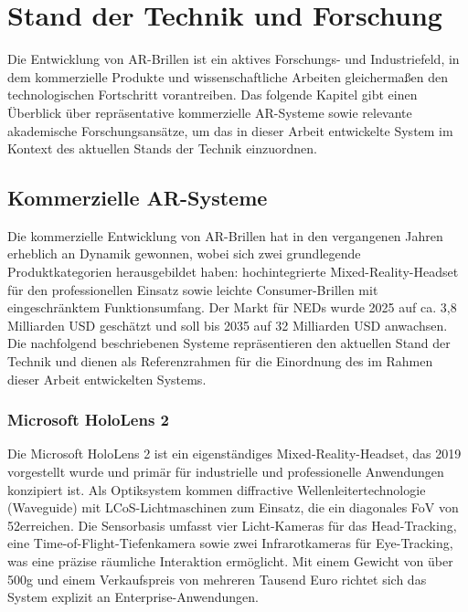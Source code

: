 

\chapter{Stand der Technik und Forschung}
\label{chap:StandTechnikUForschung}
Die Entwicklung von \ac{AR}-Brillen ist ein aktives Forschungs- und Industriefeld, in dem kommerzielle Produkte und wissenschaftliche Arbeiten gleichermaßen den technologischen Fortschritt vorantreiben. Das folgende Kapitel gibt einen Überblick über repräsentative kommerzielle \ac{AR}-Systeme sowie relevante akademische Forschungsansätze, um das in dieser Arbeit entwickelte System im Kontext des aktuellen Stands der Technik einzuordnen.

\section{Kommerzielle AR-Systeme}
\label{sec:KommerzielleSysteme}
Die kommerzielle Entwicklung von \ac{AR}-Brillen hat in den vergangenen Jahren erheblich an Dynamik gewonnen, wobei sich zwei grundlegende Produktkategorien herausgebildet haben: hochintegrierte Mixed-Reality-Headset für den professionellen Einsatz sowie leichte Consumer-Brillen mit eingeschränktem Funktionsumfang. Der Markt für \ac{NED}s wurde 2025 auf ca. 3,8 Milliarden USD geschätzt und soll bis 2035 auf 32 Milliarden USD anwachsen. Die nachfolgend beschriebenen Systeme repräsentieren den aktuellen Stand der Technik und dienen als Referenzrahmen für die Einordnung des im Rahmen dieser Arbeit entwickelten Systems.\autocite[vgl. ]{EyeDisplayMarket}

\subsection{Microsoft HoloLens 2}
\label{subsec:HoloLens}
Die Microsoft HoloLens 2 ist ein eigenständiges Mixed-Reality-Headset, das 2019 vorgestellt wurde und primär für industrielle und professionelle Anwendungen konzipiert ist. Als Optiksystem kommen diffractive Wellenleitertechnologie (Waveguide) mit \ac{LCoS}-Lichtmaschinen zum Einsatz, die ein diagonales \ac{FoV} von 52\textdegree erreichen. 
\newpage
Die Sensorbasis umfasst vier Licht-Kameras für das Head-Tracking, eine Time-of-Flight-Tiefenkamera sowie zwei Infrarotkameras für Eye-Tracking, was eine präzise räumliche Interaktion ermöglicht. Mit einem Gewicht von über 500g und einem Verkaufspreis von mehreren Tausend Euro richtet sich das System explizit an Enterprise-Anwendungen.\autocite[vgl. ]{msbryanHoloLensHardware}

